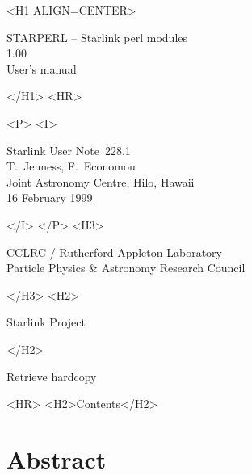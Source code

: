 \documentclass[twoside,11pt]{article}
\newcommand{\stardoccategory}  {Starlink User Note}
\newcommand{\stardocsource}    {sun\stardocnumber}
\newcommand{\stardocnumber}    {228.1}
\newcommand{\stardocauthors}   {T.\ Jenness, F.\ Economou\\
                                Joint Astronomy Centre, Hilo, Hawaii}
\newcommand{\stardocdate}      {16 February 1999}
\newcommand{\stardoctitle}     {STARPERL -- Starlink perl modules}
\newcommand{\stardocversion}   {1.00}
\newcommand{\stardocmanual}    {User's manual}
\newcommand{\htmladdnormallink}[2]{#1}
\newcommand{\htmladdimg}[1]{}
\newcommand{\htmlref}[2]{#1}
\newcommand{\htmladdtonavigation}[1]{}
\newcommand{\xlabel}[1]{}
\renewcommand{\_}{\texttt{\symbol{95}}}
\begin{document}
\begin{htmlonly}
   \xlabel{}
   \begin{rawhtml} <H1 ALIGN=CENTER> \end{rawhtml}
      \stardoctitle\\
      \stardocversion\\
      \stardocmanual
   \begin{rawhtml} </H1> <HR> \end{rawhtml}


   \begin{rawhtml} <P> <I> \end{rawhtml}
   \stardoccategory\ \stardocnumber \\
   \stardocauthors \\
   \stardocdate
   \begin{rawhtml} </I> </P> <H3> \end{rawhtml}
      \htmladdnormallink{CCLRC}{http://www.cclrc.ac.uk} /
      \htmladdnormallink{Rutherford Appleton Laboratory}
                        {http://www.cclrc.ac.uk/ral} \\
      \htmladdnormallink{Particle Physics \& Astronomy Research Council}
                        {http://www.pparc.ac.uk} \\
   \begin{rawhtml} </H3> <H2> \end{rawhtml}
      \htmladdnormallink{Starlink Project}{http://star-www.rl.ac.uk/}
   \begin{rawhtml} </H2> \end{rawhtml}
   \htmladdnormallink{\htmladdimg{source.gif} Retrieve hardcopy}
      {http://star-www.rl.ac.uk/cgi-bin/hcserver?\stardocsource}\\

  \label{stardoccontents}
  \begin{rawhtml} 
    <HR>
    <H2>Contents</H2>
  \end{rawhtml}
  \htmladdtonavigation{\htmlref{\htmladdimg{contents_motif.gif}}
        {stardoccontents}}

  \section{\xlabel{abstract}Abstract}
\end{htmlonly}
\end{document}
